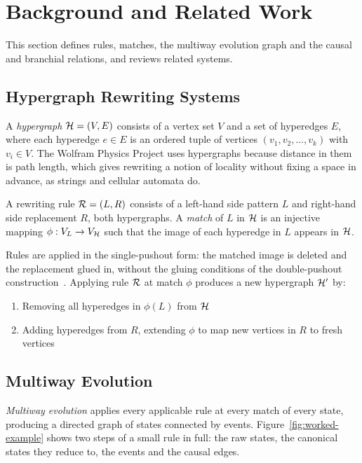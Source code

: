 \section{Background and Related Work}
\label{sec:background}

This section defines rules, matches, the multiway evolution graph and the causal and branchial
relations, and reviews related systems.

\subsection{Hypergraph Rewriting Systems}

A \emph{hypergraph} $\mathcal{H} = (V, E)$ consists of a vertex set $V$ and a set of hyperedges $E$, where each hyperedge $e \in E$ is an ordered tuple of vertices $(v_1, v_2, \ldots, v_k)$ with $v_i \in V$. The Wolfram Physics Project uses hypergraphs because distance in them is path length, which gives rewriting a notion of locality without fixing a space in advance, as strings and cellular automata do.

\begin{definition}
A rewriting rule $\mathcal{R} = (L, R)$ consists of a left-hand side pattern $L$ and right-hand side replacement $R$, both hypergraphs. A \emph{match} of $L$ in $\mathcal{H}$ is an injective mapping $\phi: V_L \to V_{\mathcal{H}}$ such that the image of each hyperedge in $L$ appears in $\mathcal{H}$.
\end{definition}

Rules are applied in the single-pushout form: the matched image is deleted and the replacement glued in, without the gluing conditions of the double-pushout construction~\cite{ehrig2006fundamentals,rozenberg1997handbook,plump2009graph}. Applying rule $\mathcal{R}$ at match $\phi$ produces a new hypergraph $\mathcal{H}'$ by:
\begin{enumerate}
    \item Removing all hyperedges in $\phi(L)$ from $\mathcal{H}$
    \item Adding hyperedges from $R$, extending $\phi$ to map new vertices in $R$ to fresh vertices
\end{enumerate}

\subsection{Multiway Evolution}

\emph{Multiway evolution} applies every applicable rule at every match of every state, producing a directed graph of states connected by events. Figure~\ref{fig:worked-example} shows two steps of a small rule in full: the raw states, the canonical states they reduce to, the events and the causal edges.

